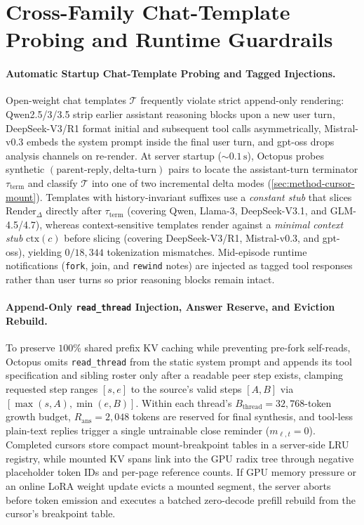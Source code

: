\documentclass{article}
\begin{document}
{\setlength{\parskip}{0pt}
\renewcommand{\bibfont}{\fontsize{7.8pt}{8.9pt}\selectfont}
\setlength{\bibsep}{0pt}


}

\clearpage
\appendix
\setlength{\parskip}{3.5pt plus 0.6pt minus 0.3pt}
\section{Cross-Family Chat-Template Probing and Runtime Guardrails}
\label{app:runtime-details}

\paragraph{Automatic Startup Chat-Template Probing and Tagged Injections.}
Open-weight chat templates $\mathcal{T}$ frequently violate strict append-only rendering: Qwen2.5/3/3.5 strip earlier assistant reasoning blocks upon a new user turn, DeepSeek-V3/R1 format initial and subsequent tool calls asymmetrically, Mistral-v0.3 embeds the system prompt inside the final user turn, and gpt-oss drops analysis channels on re-render. At server startup ($\sim 0.1\,\text{s}$), Octopus probes synthetic $(\text{parent-reply}, \text{delta-turn})$ pairs to locate the assistant-turn terminator $\tau_{\text{term}}$ and classify $\mathcal{T}$ into one of two incremental delta modes (\cref{sec:method-cursor-mount}). Templates with history-invariant suffixes use a \emph{constant stub} that slices $\mathrm{Render}_\Delta$ directly after $\tau_{\text{term}}$ (covering Qwen, Llama-3, DeepSeek-V3.1, and GLM-4.5/4.7), whereas context-sensitive templates render against a \emph{minimal context stub} $\mathrm{ctx}(c)$ before slicing (covering DeepSeek-V3/R1, Mistral-v0.3, and gpt-oss), yielding $0 / 18{,}344$ tokenization mismatches. Mid-episode runtime notifications (\texttt{fork}, join, and \texttt{rewind} notes) are injected as tagged tool responses rather than user turns so prior reasoning blocks remain intact.

\paragraph{Append-Only \texttt{read\_thread} Injection, Answer Reserve, and Eviction Rebuild.}
To preserve $100\%$ shared prefix KV caching while preventing pre-fork self-reads, Octopus omits \texttt{read\_thread} from the static system prompt and appends its tool specification and sibling roster only after a readable peer step exists, clamping requested step ranges $[s, e]$ to the source's valid steps $[A, B]$ via $[\max(s, A), \min(e, B)]$. Within each thread's $B_{\text{thread}} = 32{,}768$-token growth budget, $R_{\text{ans}} = 2{,}048$ tokens are reserved for final synthesis, and tool-less plain-text replies trigger a single untrainable close reminder ($m_{\ell,t}=0$). Completed cursors store compact mount-breakpoint tables in a server-side LRU registry, while mounted KV spans link into the GPU radix tree through negative placeholder token IDs and per-page reference counts. If GPU memory pressure or an online LoRA weight update evicts a mounted segment, the server aborts before token emission and executes a batched zero-decode prefill rebuild from the cursor's breakpoint table.
\end{document}
